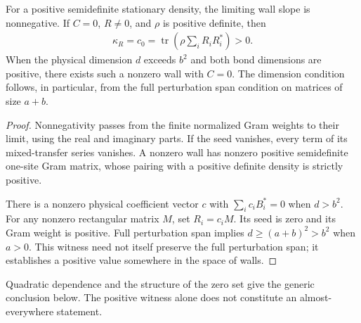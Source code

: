 \begin{lemma}
    \label{lem:uncle_wall_gram_positive_witness}
    \leanok
    For a positive semidefinite stationary density, the limiting wall
    slope is nonnegative. If $C=0$, $R\ne0$, and $\rho$ is positive
    definite, then
    \begin{align}
        \kappa_R=c_0=\operatorname{tr}\!\left(\rho\sum_iR_iR_i^*\right)>0.
    \end{align}
    When the physical dimension $d$ exceeds $b^2$ and both bond dimensions
    are positive, there exists such a nonzero wall with $C=0$. The
    dimension condition follows, in particular, from the full
    perturbation span condition on matrices of size $a+b$.
\end{lemma}
\begin{proof}
    \leanok
    Nonnegativity passes from the finite normalized Gram weights to their
    limit, using the real and imaginary parts. If the seed vanishes,
    every term of its mixed-transfer series vanishes. A nonzero wall has
    nonzero positive semidefinite one-site Gram matrix, whose pairing
    with a positive definite density is strictly positive.

    There is a nonzero physical coefficient vector $c$ with
    $\sum_i c_iB_i^*=0$ when $d>b^2$. For any nonzero rectangular matrix
    $M$, set $R_i=c_iM$. Its seed is zero and its Gram weight is positive.
    Full perturbation span implies $d\ge(a+b)^2>b^2$ when $a>0$.
    This witness need not itself preserve the full perturbation span;
    it establishes a positive value somewhere in the space of walls.
\end{proof}

Quadratic dependence and the structure of the zero set give the generic
conclusion below. The positive witness alone does not constitute an
almost-everywhere statement.

